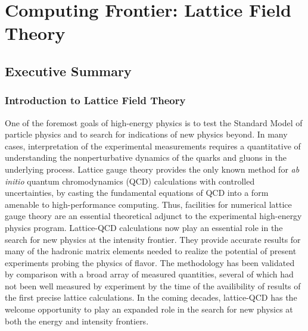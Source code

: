  
\chapter{Computing Frontier: Lattice Field Theory}
\label{chap:LFT}

\begin{center}\begin{boldmath}



\end{boldmath}\end{center}


\section{Executive Summary}
\label{sec:comp-exec}

\subsection{Introduction to Lattice Field Theory}

One of the foremost goals of high-energy physics is to test the Standard Model
of particle physics and to search for indications of new physics beyond. In
many cases, interpretation of the experimental measurements requires a
quantitative of understanding the nonperturbative dynamics of the quarks and
gluons in the underlying process.  Lattice gauge theory provides the only
known method for \emph{ab initio} quantum chromodynamics (QCD) calculations
with controlled uncertainties, by casting the fundamental equations of QCD
into a form amenable to high-performance computing.  Thus, facilities for
numerical lattice gauge theory are an essential theoretical adjunct to the
experimental high-energy physics program.  Lattice-QCD calculations now play
an essential role in the search for new physics at the intensity frontier.
They provide accurate results for many of the hadronic matrix elements needed
to realize the potential of present experiments probing the physics of
flavor. The methodology has been validated by comparison with a broad array of
measured quantities, several of which had not been well measured by experiment
by the time of the availibility of results of the first precise lattice
calculations.  In the coming decades, lattice-QCD has the welcome opportunity
to play an expanded role in the search for new physics at both the energy and
intensity frontiers.

